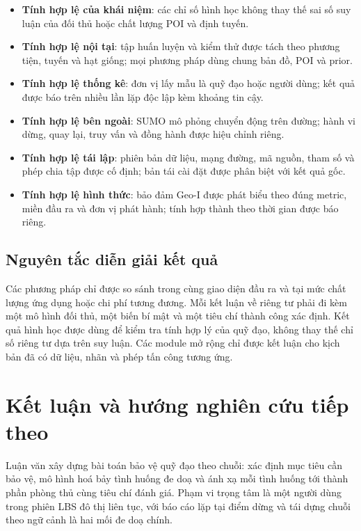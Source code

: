 \documentclass[12pt,a4paper,oneside]{report}
\begin{document}
\begin{itemize}
  \item \textbf{Tính hợp lệ của khái niệm}: các chỉ số hình học không thay thế sai số suy luận của đối thủ hoặc chất lượng POI và định tuyến.
  \item \textbf{Tính hợp lệ nội tại}: tập huấn luyện và kiểm thử được tách theo phương tiện, tuyến và hạt giống; mọi phương pháp dùng chung bản đồ, POI và prior.
  \item \textbf{Tính hợp lệ thống kê}: đơn vị lấy mẫu là quỹ đạo hoặc người dùng; kết quả được báo trên nhiều lần lặp độc lập kèm khoảng tin cậy.
  \item \textbf{Tính hợp lệ bên ngoài}: SUMO mô phỏng chuyển động trên đường; hành vi dừng, quay lại, truy vấn và đồng hành được hiệu chỉnh riêng.
  \item \textbf{Tính hợp lệ tái lập}: phiên bản dữ liệu, mạng đường, mã nguồn, tham số và phép chia tập được cố định; bản tái cài đặt được phân biệt với kết quả gốc.
  \item \textbf{Tính hợp lệ hình thức}: bảo đảm Geo-I được phát biểu theo đúng metric, miền đầu ra và đơn vị phát hành; tính hợp thành theo thời gian được báo riêng.
\end{itemize}

\section{Nguyên tắc diễn giải kết quả}

Các phương pháp chỉ được so sánh trong cùng giao diện đầu ra và tại mức chất lượng ứng dụng hoặc chi phí tương đương. Mỗi kết luận về riêng tư phải đi kèm một mô hình đối thủ, một biến bí mật và một tiêu chí thành công xác định. Kết quả hình học được dùng để kiểm tra tính hợp lý của quỹ đạo, không thay thế chỉ số riêng tư dựa trên suy luận. Các module mở rộng chỉ được kết luận cho kịch bản đã có dữ liệu, nhãn và phép tấn công tương ứng.

\chapter{Kết luận và hướng nghiên cứu tiếp theo}

Luận văn xây dựng bài toán bảo vệ quỹ đạo theo chuỗi: xác định mục tiêu cần bảo vệ, mô hình hoá bảy tình huống đe doạ và ánh xạ mỗi tình huống tới thành phần phòng thủ cùng tiêu chí đánh giá. Phạm vi trọng tâm là một người dùng trong phiên LBS đô thị liên tục, với báo cáo lặp tại điểm dừng và tái dựng chuỗi theo ngữ cảnh là hai mối đe doạ chính.
\end{document}
